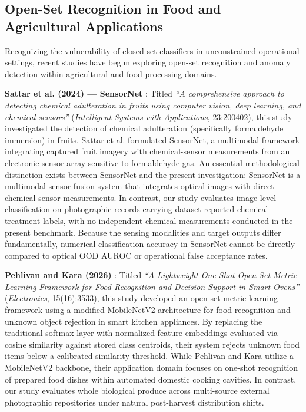 \subsection{Open-Set Recognition in Food and Agricultural Applications}
\label{sec:agri_osr_applications}

Recognizing the vulnerability of closed-set classifiers in unconstrained operational settings, recent studies have begun exploring open-set recognition and anomaly detection within agricultural and food-processing domains.

\textbf{Sattar et al. (2024) --- SensorNet} \cite{sattar2024sensornet}: Titled \textit{``A comprehensive approach to detecting chemical adulteration in fruits using computer vision, deep learning, and chemical sensors''} (\textit{Intelligent Systems with Applications}, 23:200402), this study investigated the detection of chemical adulteration (specifically formaldehyde immersion) in fruits. Sattar et al. formulated SensorNet, a multimodal framework integrating captured fruit imagery with chemical-sensor measurements from an electronic sensor array sensitive to formaldehyde gas. An essential methodological distinction exists between SensorNet and the present investigation: SensorNet is a multimodal sensor-fusion system that integrates optical images with direct chemical-sensor measurements. In contrast, our study evaluates image-level classification on photographic records carrying dataset-reported chemical treatment labels, with no independent chemical measurements conducted in the present benchmark. Because the sensing modalities and target outputs differ fundamentally, numerical classification accuracy in SensorNet cannot be directly compared to optical OOD AUROC or operational false acceptance rates.

\textbf{Pehlivan and Kara (2026)} \cite{pehlivan2026lightweight}: Titled \textit{``A Lightweight One-Shot Open-Set Metric Learning Framework for Food Recognition and Decision Support in Smart Ovens''} (\textit{Electronics}, 15(16):3533), this study developed an open-set metric learning framework using a modified MobileNetV2 architecture for food recognition and unknown object rejection in smart kitchen appliances. By replacing the traditional softmax layer with normalized feature embeddings evaluated via cosine similarity against stored class centroids, their system rejects unknown food items below a calibrated similarity threshold. While Pehlivan and Kara utilize a MobileNetV2 backbone, their application domain focuses on one-shot recognition of prepared food dishes within automated domestic cooking cavities. In contrast, our study evaluates whole biological produce across multi-source external photographic repositories under natural post-harvest distribution shifts.

